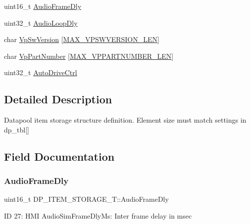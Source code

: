 \begin{DoxyCompactItemize}
\item 
uint16\+\_\+t \mbox{\hyperlink{structDP__ITEM__STORAGE__T_a096f4d68677a0a79657d44180a6108d9}{Audio\+Frame\+Dly}}
\item 
uint32\+\_\+t \mbox{\hyperlink{structDP__ITEM__STORAGE__T_a0bb3c62465a47f3a2575c267b00a46b1}{Audio\+Loop\+Dly}}
\item 
char \mbox{\hyperlink{structDP__ITEM__STORAGE__T_ac8d46a0dd9ae25c2d8165a334273db52}{Vp\+Sw\+Version}} \mbox{[}\mbox{\hyperlink{pool__def_8h_a684465130bf633ce7dd970f1cc9df9c8}{M\+A\+X\+\_\+\+V\+P\+S\+W\+V\+E\+R\+S\+I\+O\+N\+\_\+\+L\+EN}}\mbox{]}
\item 
char \mbox{\hyperlink{structDP__ITEM__STORAGE__T_afe91454e9b91bb4d620309c1e19a8b4f}{Vp\+Part\+Number}} \mbox{[}\mbox{\hyperlink{pool__def_8h_aae7c7739b651b131c3d05c025f512585}{M\+A\+X\+\_\+\+V\+P\+P\+A\+R\+T\+N\+U\+M\+B\+E\+R\+\_\+\+L\+EN}}\mbox{]}
\item 
uint32\+\_\+t \mbox{\hyperlink{structDP__ITEM__STORAGE__T_a56c250591f339139e804592b1ad80b80}{Auto\+Drive\+Ctrl}}
\end{DoxyCompactItemize}


\subsection{Detailed Description}
Datapool item storage structure definition. Element size must match settings in dp\+\_\+tbl\mbox{[}\mbox{]} 

\subsection{Field Documentation}
\mbox{\label{structDP__ITEM__STORAGE__T_a096f4d68677a0a79657d44180a6108d9}} 
\subsubsection{\texorpdfstring{Audio\+Frame\+Dly}{AudioFrameDly}}
{\footnotesize\ttfamily uint16\+\_\+t D\+P\+\_\+\+I\+T\+E\+M\+\_\+\+S\+T\+O\+R\+A\+G\+E\+\_\+\+T\+::\+Audio\+Frame\+Dly}

ID 27\+: H\+MI Audio\+Sim\+Frame\+Dly\+Ms\+: Inter frame delay in msec \mbox{\label{structDP__ITEM__STORAGE__T_a0bb3c62465a47f3a2575c267b00a46b1}} 

